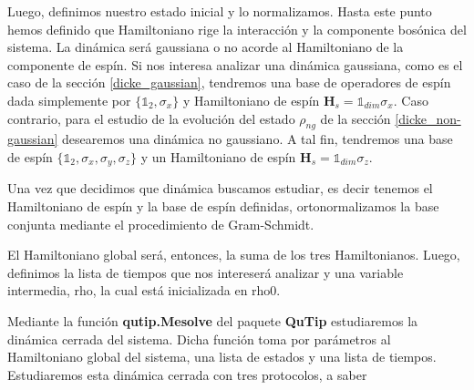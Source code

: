 \documentclass{report} %
\numberwithin{equation}{section}
\begin{document}
Luego, definimos nuestro estado inicial y lo normalizamos. Hasta este punto hemos definido que Hamiltoniano rige la interacción y la componente bosónica del sistema. La dinámica será gaussiana o no acorde al Hamiltoniano de la componente de espín. Si nos interesa analizar una dinámica gaussiana, como es el caso de la sección \ref{dicke_gaussian}, tendremos  una base de operadores de espín dada simplemente por $\{\mathds{1}_2, \sigma_x\}$ y Hamiltoniano de espín $\mathbf{H}_s= \mathds{1}_{dim} \sigma_x$. Caso contrario, para el estudio de la evolución del estado $\rho_{ng}$ de la sección \ref{dicke_non-gaussian} desearemos una dinámica no gaussiano. A tal fin, tendremos una base de espín $\{\mathds{1}_2, \sigma_x, \sigma_y, \sigma_z\}$ y un Hamiltoniano de espín $\mathbf{H}_s = \mathds{1}_{dim} \sigma_z$.

Una vez que decidimos que dinámica buscamos estudiar, es decir tenemos el Hamiltoniano de espín y la base de espín definidas, ortonormalizamos la base conjunta mediante el procedimiento de Gram-Schmidt. 

El Hamiltoniano global será, entonces, la suma de los tres Hamiltonianos. Luego, definimos la lista de tiempos que nos intereserá analizar y una variable intermedia, rho, la cual está inicializada en rho0.

Mediante la función \textbf{qutip.Mesolve} del paquete \textbf{QuTip} estudiaremos la dinámica cerrada del sistema. Dicha función toma por parámetros al Hamiltoniano global del sistema, una lista de estados y una lista de tiempos. Estudiaremos esta dinámica cerrada con tres protocolos, a saber
\end{document}
